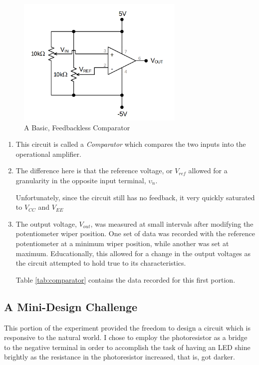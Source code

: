 \documentclass[12pt]{article}
\begin{document}
\begin{figure}[H]
	\centering
	\includegraphics[width=8cm]{02_3}
	\caption{A Basic, Feedbackless Comparator}
	\label{fig:comparator}
\end{figure}
\begin{enumerate}
	\item This circuit is called a \textit{Comparator} which compares the two
	      inputs into the operational amplifier.
	\item The difference here is that the reference voltage, or \(V_{ref}\)
	      allowed for a granularity in the opposite input terminal,
	      \(\upsilon_n\).

	      Unfortunately, since the circuit still has no feedback, it very quickly
	      saturated to \(V_{CC}\) and \(V_{EE}\)

	\item The output voltage, \(V_{out}\), was measured at small intervals after modifying the
	      potentiometer wiper position. One set of data was recorded with the
	      reference potentiometer at a minimum wiper position, while another was
	      set at maximum. Educationally, this allowed for a change in the output
	      voltages as the circuit attempted to hold true to its characteristics.

	      Table \ref{tab:comparator} contains the data recorded for this first
	      portion.
\end{enumerate}

\subsection{A Mini-Design Challenge}
This portion of the experiment provided the freedom to design a circuit which is
responsive to the natural world. I chose to employ the photoresistor as a bridge
to the negative terminal in order to accomplish the task of having an LED shine
brightly as the resistance in the photoresistor increased, that is, got darker.
\end{document}
